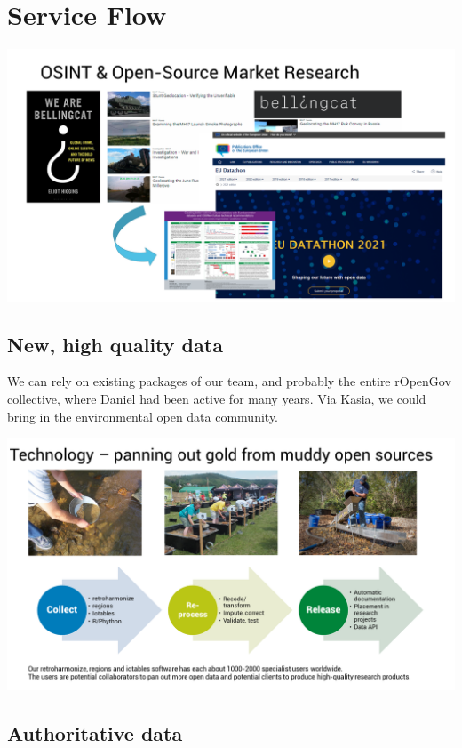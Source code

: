 \documentclass[
  a4paper,
  openany, a4paper, oneside]{book}
\begin{document}
\hypertarget{service-flow}{%
\section{Service Flow}\label{service-flow}}

\begin{center}\includegraphics[width=0.8\linewidth]{plots/open_source_slide} \end{center}

\hypertarget{new-high-quality-data}{%
\subsection{New, high quality data}\label{new-high-quality-data}}

We can rely on existing packages of our team, and probably the entire rOpenGov collective, where Daniel had been active for many years. Via Kasia, we could bring in the environmental open data community.

\begin{center}\includegraphics[width=0.8\linewidth]{plots/gold_panning_slide} \end{center}

\hypertarget{authoritative-data}{%
\subsection{Authoritative data}\label{authoritative-data}}
\end{document}
